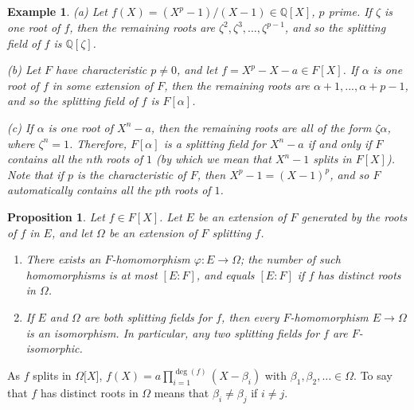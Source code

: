 \documentclass[a4paper,11pt,final,openany]{memoir}
\newtheorem{proposition}[X]{Proposition}
\newtheorem{example}[X]{Example}
\theoremstyle{nonumberplain}
\begin{document}
\begin{example}
\label{sf6}(a) Let $f(X)=(X^{p}-1)/(X-1)\in\mathbb{Q}{}[X]$, $p$ prime. If
$\zeta$ is one root of $f$, then the remaining roots are $\zeta^{2},\zeta
^{3},\ldots,\zeta^{p-1}$, and so the splitting field of $f$ is $\mathbb{Q}%
{}[\zeta]$.

(b) Let $F$ have characteristic $p\neq0$, and let $f=X^{p}-X-a\in F[X]$. If
$\alpha$ is one root of $f$ in some extension of $F$, then the remaining roots
are $\alpha+1,...,\alpha+p-1$, and so the splitting field of $f$ is
$F[\alpha]$.

(c) If $\alpha$ is one root of $X^{n}-a$, then the remaining roots are all of
the form $\zeta\alpha$, where $\zeta^{n}=1$. Therefore, $F[\alpha]$ is a
splitting field for $X^{n}-a$ if and only if $F$ contains all the $n$th roots
of $1$ (by which we mean that $X^{n}-1$ splits in $F[X]$). Note that if $p$ is
the characteristic of $F$, then $X^{p}-1=(X-1)^{p}$, and so $F$ automatically
contains all the $p$th roots of $1$.
\end{example}

\begin{proposition}
\label{sf7}Let $f\in F[X]$. Let $E$ be an extension of $F$ generated by the
roots of $f$ in $E$, and let $\Omega$ be an extension of $F$ splitting $f$.

\begin{enumerate}
\item There exists an $F$-homomorphism $\varphi\colon E\rightarrow\Omega$; the
number of such homomorphisms is at most $[E\colon F]$, and equals $[E\colon
F]$ if $f$ has distinct roots in $\Omega$.

\item If $E$ and $\Omega$ are both splitting fields for $f$, then every
$F$-homomorphism $E\rightarrow\Omega$ is an isomorphism. In particular, any
two splitting fields for $f$ are $F$-isomorphic.
\end{enumerate}
\end{proposition}

\noindent As $f$ splits in $\Omega\lbrack X]$, $f(X)=a\prod\nolimits_{i=1}%
^{\deg(f)}(X-\beta_{i})$ with $\beta_{1},\beta_{2},\ldots\in\Omega$. To say
that $f$ has distinct roots in $\Omega$ means that $\beta_{i}\neq\beta_{j}$ if
$i\neq j$.
\end{document}
